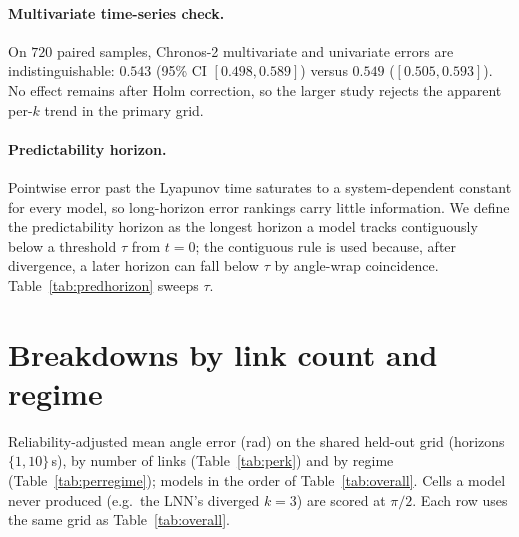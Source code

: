 \documentclass{article}
\begin{document}
\paragraph{Multivariate time-series check.}
On $720$ paired samples, Chronos-2 multivariate and univariate errors are indistinguishable:
$0.543$ (95\% CI $[0.498,0.589]$) versus $0.549$ ($[0.505,0.593]$). No effect remains after
Holm correction, so the larger study rejects the apparent per-$k$ trend in the primary grid.

\paragraph{Predictability horizon.}
Pointwise error past the Lyapunov time saturates to a system-dependent constant for every
model, so long-horizon error rankings carry little information. We define the predictability
horizon as the longest horizon a model tracks contiguously below a threshold $\tau$ from
$t{=}0$; the contiguous rule is used because, after divergence, a later horizon can fall below
$\tau$ by angle-wrap coincidence. Table~\ref{tab:predhorizon} sweeps $\tau$.

\section{Breakdowns by link count and regime}
\label{app:breakdown}
Reliability-adjusted mean angle error (rad) on the shared held-out grid
(horizons $\{1,10\}$\,s), by number of links (Table~\ref{tab:perk}) and by regime
(Table~\ref{tab:perregime}); models in the order of Table~\ref{tab:overall}. Cells a model never produced (e.g.\
the LNN's diverged $k{=}3$) are scored at $\pi/2$. Each row uses the same grid as
Table~\ref{tab:overall}.
\end{document}
